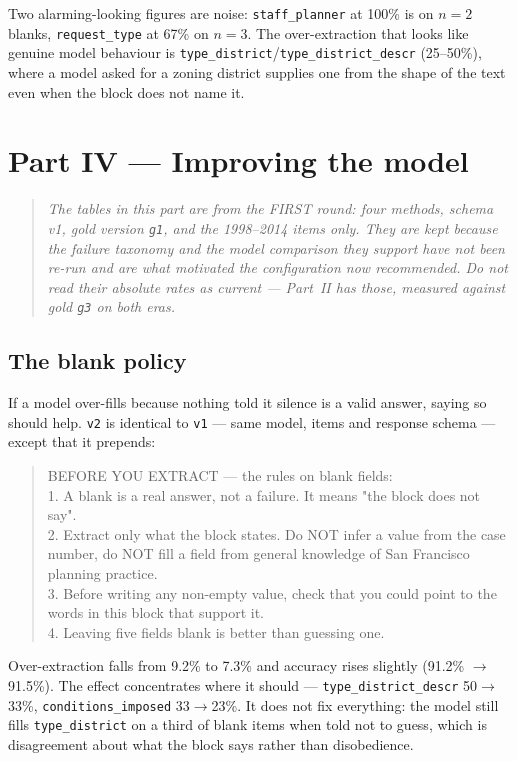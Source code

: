 \documentclass[11pt]{article}
\begin{document}
Two alarming-looking figures are noise: \texttt{staff\_planner} at 100\% is on $n=2$ blanks,
\texttt{request\_type} at 67\% on $n=3$. The over-extraction that looks like genuine model
behaviour is \texttt{type\_district}/\texttt{type\_district\_descr} (25--50\%), where a model
asked for a zoning district supplies one from the shape of the text even when the block does
not name it.

\section{Part IV --- Improving the model}

\begin{quote}\small\itshape
The tables in this part are from the FIRST round: four methods, schema v1, gold version
\texttt{g1}, and the 1998--2014 items only. They are kept because the failure taxonomy and the
model comparison they support have not been re-run and are what motivated the configuration
now recommended. Do not read their absolute rates as current --- Part~II has those, measured
against gold \texttt{g3} on both eras.
\end{quote}

\subsection{The blank policy}
\label{sec:v2}

If a model over-fills because nothing told it silence is a valid answer, saying so should
help. \texttt{v2} is identical to \texttt{v1} --- same model, items and response schema ---
except that it prepends:

\begin{quote}\small\ttfamily\sloppy
BEFORE YOU EXTRACT --- the rules on blank fields:\\[2pt]
1. A blank is a real answer, not a failure. It means "the block does not say".\\
2. Extract only what the block states. Do NOT infer a value from the case number, do NOT
fill a field from general knowledge of San Francisco planning practice.\\
3. Before writing any non-empty value, check that you could point to the words in this block
that support it.\\
4. Leaving five fields blank is better than guessing one.
\end{quote}

Over-extraction falls from 9.2\% to 7.3\% and accuracy rises slightly (91.2\%
$\rightarrow$ 91.5\%). The effect concentrates where it should ---
\texttt{type\_district\_descr} 50$\rightarrow$33\%, \texttt{conditions\_imposed}
33$\rightarrow$23\%. It does not fix everything: the model still fills
\texttt{type\_district} on a third of blank items when told not to guess, which is
disagreement about what the block says rather than disobedience.
\end{document}
